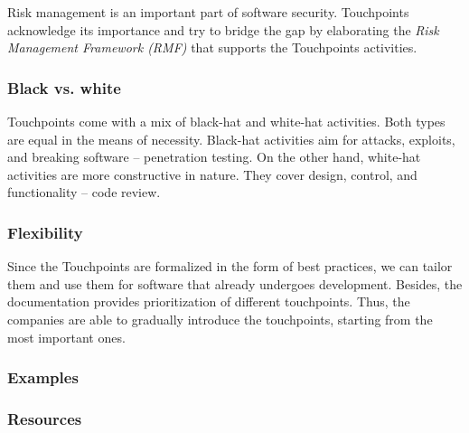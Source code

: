 \documentclass[12pt,a4,twoside]{article}
\begin{document}
Risk management is an important part of software security. Touchpoints acknowledge its importance and try to bridge the gap by elaborating the \textit{Risk Management Framework (RMF)} that supports the Touchpoints activities.

\subsubsection{Black vs. white}

Touchpoints come with a mix of black-hat and white-hat activities. Both types are equal in the means of necessity. Black-hat activities aim for attacks, exploits, and breaking software -- penetration testing. On the other hand, white-hat activities are more constructive in nature. They cover design, control, and functionality -- code review.

\subsubsection{Flexibility}

Since the Touchpoints are formalized in the form of best practices, we can tailor them and use them for software that already undergoes development. Besides, the documentation provides prioritization of different touchpoints. Thus, the companies are able to gradually introduce the touchpoints, starting from the most important ones.

\subsubsection{Examples}

\subsubsection{Resources}






















\newpage
\printbibliography
\end{document}
